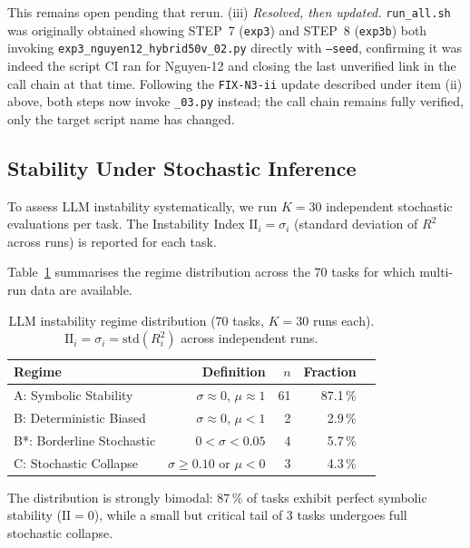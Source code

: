 \documentclass[twoside,11pt]{article}
\newcommand{\Rsq}{R^{2}}
\newcommand{\II}{\mathrm{II}}
\begin{document}
This remains open pending that rerun. (iii) \emph{Resolved, then updated.}
\texttt{run\_all.sh} was originally obtained showing STEP~7 (\texttt{exp3})
and STEP~8 (\texttt{exp3b}) both invoking
\texttt{exp3\_nguyen12\_hybrid50v\_02.py} directly with \texttt{--seed},
confirming it was indeed the script CI ran for Nguyen-12 and closing the
last unverified link in the call chain at that time. Following the
\texttt{FIX-N3-ii} update described under item (ii) above, both steps now
invoke \texttt{\_03.py} instead; the call chain remains fully verified,
only the target script name has changed.

\subsection{Stability Under Stochastic Inference}\label{subsec:stability-under-stochastic-inference}
\label{sec:instability_results}

To assess LLM instability systematically, we run $K=30$ independent stochastic
evaluations per task.  The Instability Index $\II_i = \sigma_i$ (standard deviation
of $\Rsq$ across runs) is reported for each task.

Table~\ref{tab:instability} summarises the regime distribution across the 70 tasks
for which multi-run data are available.

\begin{table}[h]
\centering
\caption{LLM instability regime distribution (70 tasks, $K=30$ runs each).
$\II_i = \sigma_i = \mathrm{std}(R^2_i)$ across independent runs.}
\label{tab:instability}
\begin{tabular}{lrrrr}
\toprule
Regime & Definition & $n$ & Fraction \\
\midrule
A: Symbolic Stability   & $\sigma\approx0$, $\mu\approx1$            & 61 & 87.1\,\% \\
B: Deterministic Biased & $\sigma\approx0$, $\mu<1$                  &  2 & 2.9\,\%  \\
B*: Borderline Stochastic & $0 < \sigma < 0.05$                      &  4 & 5.7\,\%  \\
C: Stochastic Collapse  & $\sigma \ge 0.10$ or $\mu < 0$             &  3 & 4.3\,\%  \\
\bottomrule
\end{tabular}
\end{table}

The distribution is strongly bimodal: 87\,\% of tasks exhibit perfect symbolic
stability ($\II=0$), while a small but critical tail of 3 tasks undergoes full
stochastic collapse.
\end{document}
